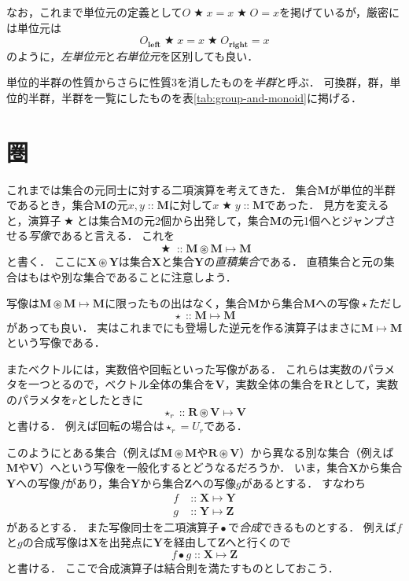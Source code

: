 \documentclass[twocolumn]{jsbook}
\newcommand{\mathKeyword}[1]{\mathbf{#1}}
\DeclareMathOperator{\mathAnyBinaryOperator}{\bigstar}
\DeclareMathOperator{\mathAnyUnaryOperator}{\star}
\DeclareMathOperator{\mathCompose}{\bullet}
\DeclareMathOperator{\mathIn}{::}
\DeclareMathOperator{\mathMapsTo}{\mapsto}
\DeclareMathOperator{\mathSetTimes}{\circledast}
\newcommand{\mathLeft}{\mathKeyword{left}}
\newcommand{\mathRight}{\mathKeyword{right}}
\newcommand{\mathSet}[1]{\mathbf{#1}}
\newcommand{\mathMorph}[2]{#1\mathMapsTo#2}
\newcommand{\keyword}[1]{\emph{#1}}
\begin{document}
なお，これまで単位元の定義として$O\mathAnyBinaryOperator x=x\mathAnyBinaryOperator O=x$を掲げているが，厳密には単位元は$$O_\mathLeft\mathAnyBinaryOperator x=x\mathAnyBinaryOperator O_\mathRight=x$$のように，\keyword{左単位元}と\keyword{右単位元}を区別しても良い．

単位的半群の性質からさらに性質3を消したものを\keyword{半群}と呼ぶ．
可換群，群，単位的半群，半群を一覧にしたものを表\ref{tab:group-and-monoid}に掲げる．

\section{圏}

これまでは集合の元同士に対する二項演算を考えてきた．
集合$\mathSet{M}$が単位的半群であるとき，集合$\mathSet{M}$の元$x,y\mathIn\mathSet{M}$に対して$x\mathAnyBinaryOperator y\mathIn\mathSet{M}$であった．
見方を変えると，演算子$\mathAnyBinaryOperator$とは集合$\mathSet{M}$の元2個から出発して，集合$\mathSet{M}$の元1個へとジャンプさせる\keyword{写像}であると言える．
これを$$\mathAnyBinaryOperator\mathIn\mathMorph{\mathSet{M}\mathSetTimes\mathSet{M}}{\mathSet{M}}$$と書く．
ここに$\mathSet{X}\mathSetTimes\mathSet{Y}$は集合$\mathSet{X}$と集合$\mathSet{Y}$の\keyword{直積集合}である．
直積集合と元の集合はもはや別な集合であることに注意しよう．

写像は$\mathMorph{\mathSet{M}\mathSetTimes\mathSet{M}}{\mathSet{M}}$に限ったもの出はなく，集合$\mathSet{M}$から集合$\mathSet{M}$への写像$\mathAnyUnaryOperator$ただし$$\mathAnyUnaryOperator\mathIn\mathMorph{\mathSet{M}}{\mathSet{M}}$$があっても良い．
実はこれまでにも登場した逆元を作る演算子はまさに$\mathMorph{\mathSet{M}}{\mathSet{M}}$という写像である．

またベクトルには，実数倍や回転といった写像がある．
これらは実数のパラメタを一つとるので，ベクトル全体の集合を$\mathSet{V}$，実数全体の集合を$\mathSet{R}$として，実数のパラメタを$r$としたときに$$\mathAnyUnaryOperator_r\mathIn\mathMorph{\mathSet{R}\mathSetTimes\mathSet{V}}{\mathSet{V}}$$と書ける．
例えば回転の場合は$\mathAnyUnaryOperator_r=U_r$である．

このようにとある集合（例えば$\mathSet{M}\mathSetTimes\mathSet{M}$や$\mathSet{R}\mathSetTimes\mathSet{V}$）から異なる別な集合（例えば$\mathSet{M}$や$\mathSet{V}$）へという写像を一般化するとどうなるだろうか．
いま，集合$\mathSet{X}$から集合$\mathSet{Y}$への写像$f$があり，集合$\mathSet{Y}$から集合$\mathSet{Z}$への写像$g$があるとする．
すなわち
\begin{align*}
f&\mathIn\mathMorph{\mathSet{X}}{\mathSet{Y}}\\
g&\mathIn\mathMorph{\mathSet{Y}}{\mathSet{Z}}
\end{align*}
があるとする．
また写像同士を二項演算子$\mathCompose$で\keyword{合成}できるものとする．
例えば$f$と$g$の合成写像は$\mathSet{X}$を出発点に$\mathSet{Y}$を経由して$\mathSet{Z}$へと行くので$$f\mathCompose g\mathIn\mathMorph{\mathSet{X}}{\mathSet{Z}}$$と書ける．
ここで合成演算子は結合則を満たすものとしておこう．
\end{document}
